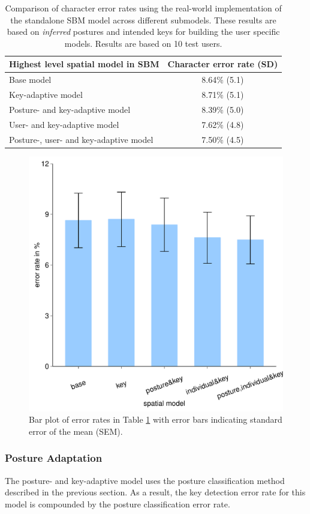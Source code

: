 \documentclass{sigchi}
\newcommand\tabhead[1]{\small\textbf{#1}}
\begin{document}
\begin{table}[tb]
 \centering
 \begin{tabular}{|l|c|}
 \hline
 \tabhead{Highest level spatial model in SBM} &  
 \multicolumn{1}{|p{0.2\columnwidth}|}{\centering\tabhead{Character error rate
 (SD)}}
 \\
 \hline
Base model & 8.64\% (5.1)\\
 \hline
 Key-adaptive model & 8.71\% (5.1) \\
 \hline
   \multicolumn{1}{|p{0.7\columnwidth}|}{Posture- and key-adaptive model} &
   8.39\% (5.0)\\
 \hline
 User- and key-adaptive model  & 7.62\% (4.8)
 \\
 \hline
 Posture-, user- and key-adaptive model &  7.50\% (4.5)
 \\
 \hline
 \end{tabular}
 \caption{Comparison of character error rates using the real-world implementation of the standalone SBM model across different submodels.  These results are based on \textit{inferred} postures and intended keys for building the user specific models. Results are based on 10 test users.}
 \label{tab:off-device}
\end{table}

\begin{figure}[tb]
 \centering
 \includegraphics[width=0.8\columnwidth,
    height=0.6\columnwidth]{figures/error-rates2.pdf}
 \caption{Bar plot of error rates in Table \ref{tab:off-device} with error
 bars indicating standard error of the mean (SEM).}
 \label{fig:error-bar2}
\end{figure}

\subsubsection{Posture Adaptation}\label{sec:off-device-posture}
The posture- and key-adaptive model uses the posture classification
method described in the previous section. As a result, the
key detection error rate for this model is compounded by the posture
classification error rate.
\end{document}
